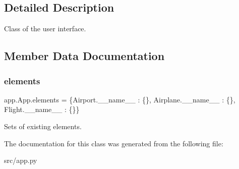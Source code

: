 \subsection{Detailed Description}
\begin{DoxyVerb}Class of the user interface.\end{DoxyVerb}
 

\subsection{Member Data Documentation}
\mbox{\label{classapp_1_1_app_a34fc4a7d78896ff3d20612ee6bb9e169}} 
\subsubsection{\texorpdfstring{elements}{elements}}
{\footnotesize\ttfamily app.\+App.\+elements = \{Airport.\+\_\+\+\_\+name\+\_\+\+\_\+ \+: \{\}, Airplane.\+\_\+\+\_\+name\+\_\+\+\_\+ \+: \{\}, Flight.\+\_\+\+\_\+name\+\_\+\+\_\+ \+: \{\}\}\hspace{0.3cm}{\ttfamily [static]}}



Sets of existing elements. 



The documentation for this class was generated from the following file\+:\begin{DoxyCompactItemize}
\item 
src/app.\+py\end{DoxyCompactItemize}
